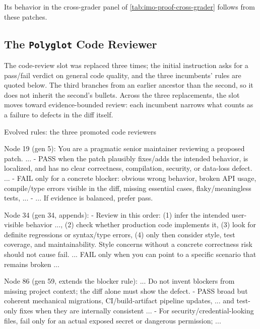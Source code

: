 \documentclass{paper}
\newcommand{\polyglot}{\texttt{Polyglot}\xspace}
\begin{document}
Its behavior in the cross-grader panel of \cref{tab:imo-proof-cross-grader} follows from these patches.

\subsection{The \polyglot Code Reviewer}
\label{app:evaluator-evolution:critic}

The code-review slot was replaced three times; the initial instruction asks for a pass/fail verdict on general code quality, and the three incumbents' rules are quoted below. The third branches from an earlier ancestor than the second, so it does not inherit the second's bullets. Across the three replacements, the slot moves toward evidence-bounded review: each incumbent narrows what counts as a failure to defects in the diff itself.

\begin{promptbox}{Evolved rules: the three promoted code reviewers}
\begin{PromptVerb}
Node 19 (gen 5): You are a pragmatic senior maintainer reviewing a
proposed patch. ...
- PASS when the patch plausibly fixes/adds the intended behavior, is
  localized, and has no clear correctness, compilation, security, or
  data-loss defect. ...
- FAIL only for a concrete blocker: obvious wrong behavior, broken API
  usage, compile/type errors visible in the diff, missing essential
  cases, flaky/meaningless tests, ...
- ... If evidence is balanced, prefer pass.

Node 34 (gen 34, appends): - Review in this order: (1) infer the
intended user-visible behavior ..., (2) check whether production code
implements it, (3) look for definite regressions or syntax/type
errors, (4) only then consider style, test coverage, and
maintainability. Style concerns without a concrete correctness risk
should not cause fail. ... FAIL only when you can point to a specific
scenario that remains broken ...

Node 86 (gen 59, extends the blocker rule): ... Do not invent blockers
from missing project context; the diff alone must show the defect.
- PASS broad but coherent mechanical migrations, CI/build-artifact
  pipeline updates, ... and test-only fixes when they are internally
  consistent ...
- For security/credential-looking files, fail only for an actual
  exposed secret or dangerous permission; ...
\end{PromptVerb}
\end{promptbox}
\end{document}
